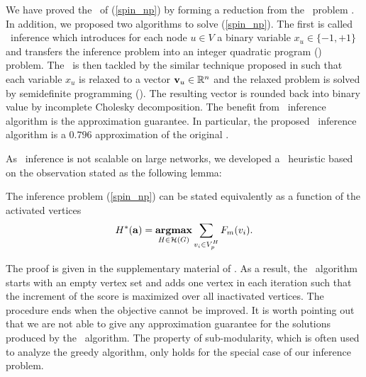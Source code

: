 {We have proved the \nphardness\ of (\ref{spin_np}) by forming a reduction from the \maxcut\ problem \citep{Garey90computers}.
In addition, we proposed two algorithms to solve (\ref{spin_np}).
The first is called {\sdp\ inference} which introduces for each node $u\in V$ a binary variable $x_u\in\{-1,+1\}$ and transfers the inference problem into an integer quadratic program (\iqp) problem.
The \iqp\ is then tackled by the similar technique proposed in \citep{Geomans1995improved} such that each variable $x_u$ is relaxed to a vector $\mathbf {v}_u\in\mathbb{R}^n$ and the relaxed problem is solved by semidefinite programming (\sdp). 
The resulting vector is rounded back into binary value by incomplete Cholesky decomposition.
The benefit from \sdp\ inference algorithm is the approximation guarantee. 
In particular, the proposed \sdp\ inference algorithm is a $0.796$ approximation of the original \iqp.

As \sdp\ inference is not scalable on large networks, we developed a \greedy\ heuristic based on the observation stated as the following lemma:
\begin{lemma}
	The inference problem (\ref{spin_np}) can be stated equivalently as a function of the activated vertices
	\begin{align*}
		H^{*}(\mathbf {a}) = \underset{{H \in {\cal H}(G)}}{\textbf{argmax}} \sum_{ \substack{v_i\in V^H_{\sc p}}}F_m(v_i). \nonumber 
	\end{align*}
\end{lemma}
\noindent
The proof is given in the supplementary material of . 
As a result, the \greedy\ algorithm starts with an empty vertex set and adds one vertex in each iteration such that the increment of the score is maximized over all inactivated vertices.
The procedure ends when the objective cannot be improved.  
It is worth pointing out that we are not able to give any approximation guarantee for the solutions produced by the \greedy\ algorithm.
The property of sub-modularity, which is often used to analyze the greedy algorithm, only holds for the special case of our inference problem.


}
